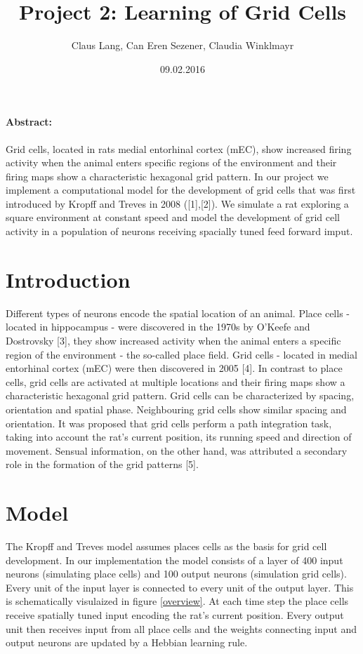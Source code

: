 \documentclass[a4paper, 12pt]{article}
\title{Project 2: Learning of Grid Cells}
\author{Claus Lang, Can Eren Sezener, Claudia Winklmayr}
\date{09.02.2016}
\begin{document}
\maketitle

\paragraph{Abstract:}
Grid cells, located in rats medial entorhinal cortex (mEC), show increased firing activity when the animal enters specific regions of the environment and their firing maps show a characteristic hexagonal grid pattern. In our project we implement a computational model for the development of grid cells that was first introduced by Kropff and Treves in 2008 ([1],[2]). We simulate a rat exploring a square environment at constant speed and model the development of grid cell activity in a population of neurons receiving spacially tuned feed forward imput. 
 

\section{Introduction}
Different types of neurons encode the spatial location of an animal. Place cells - located in hippocampus - were discovered in the 1970s by O'Keefe and Dostrovsky [3], they show increased activity when the animal enters a specific region of the environment - the so-called place field.\newline
Grid cells - located in medial entorhinal cortex (mEC) were then discovered in 2005 [4]. In contrast to place cells, grid cells are activated at multiple locations and their firing maps show a characteristic hexagonal grid pattern. Grid cells can be characterized by spacing, orientation and spatial phase. Neighbouring grid cells show similar spacing and orientation. \newline
It was proposed that grid cells perform a path integration task, taking into account the rat's current position, its running speed and direction of movement. Sensual information, on the other hand, was attributed a secondary role in the formation of the grid patterns [5]. \newline
%
%
%
\section{Model}
The Kropff and Treves model assumes places cells as the basis for grid cell development. In our implementation the model consists of a layer of 400 input neurons (simulating place cells) and 100 output neurons (simulation grid cells). Every unit of the input layer is connected to every unit of the output layer. This is schematically visulaized in figure \ref{overview}. At each time step the place cells receive spatially tuned input encoding the rat's current position. Every output unit then receives input from all place cells and the weights connecting input and output neurons are updated by a Hebbian learning rule. 
\end{document}
